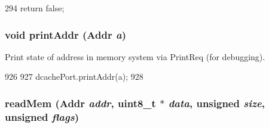 \begin{DoxyCode}
294 { return false; }
\end{DoxyCode}
\hypertarget{classTimingSimpleCPU_a88aa41e2693dd0091afae2604eba9bed}{
\subsubsection[{printAddr}]{\setlength{\rightskip}{0pt plus 5cm}void printAddr ({\bf Addr} {\em a})}}
\label{classTimingSimpleCPU_a88aa41e2693dd0091afae2604eba9bed}
Print state of address in memory system via PrintReq (for debugging). 


\begin{DoxyCode}
926 {
927     dcachePort.printAddr(a);
928 }
\end{DoxyCode}
\hypertarget{classTimingSimpleCPU_a66191b2d8a45050b7df3c3efa7bb07c6}{
\subsubsection[{readMem}]{ readMem ({\bf Addr} {\em addr}, \/  uint8\_\-t $\ast$ {\em data}, \/  unsigned {\em size}, \/  unsigned {\em flags})}}
\label{classTimingSimpleCPU_a66191b2d8a45050b7df3c3efa7bb07c6}



